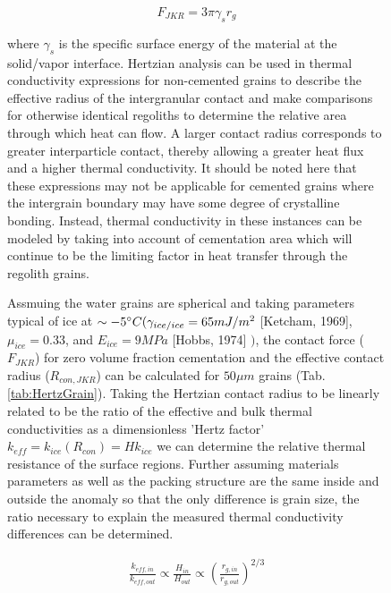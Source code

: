 \documentclass[11pt]{article} %
\begin{document}
\begin{figure}[ht]
	 \begin{equation}
	 F_{JKR} = 3 \pi \gamma_{s} r_{g}
	 \end{equation} 
	 
	 where $\gamma_{s}$ is the specific surface energy of the material at the solid/vapor interface. Hertzian analysis can be used in thermal conductivity expressions for non-cemented grains to describe the effective radius of the intergranular contact and make comparisons for otherwise identical regoliths to determine the relative area through which heat can flow. A larger contact radius corresponds to greater interparticle contact, thereby allowing a greater heat flux and a higher thermal conductivity. It should be noted here that these expressions may not be applicable for cemented grains where the intergrain boundary may have some degree of crystalline bonding. Instead, thermal conductivity in these instances can be modeled by taking into account of cementation area which will continue to be the limiting factor in heat transfer through the regolith grains. 
	 

	Assmuing the water grains are spherical and taking parameters typical of ice at $\sim-5\degree C (\gamma_{ice/ice} = 65 mJ/m^{2}$ [Ketcham, 1969], $\mu_{ice} = 0.33$, and $E_{ice} = 9 MPa$ [Hobbs, 1974] $)$, the contact force ($F_{JKR}$) for zero volume fraction cementation and the effective contact radius ($R_{con,JKR}$) can be calculated for $50 \mu m$ grains (Tab.\ref{tab:HertzGrain}). Taking the Hertzian contact radius to be linearly related to be the ratio of the effective and bulk thermal conductivities as a dimensionless 'Hertz factor' $k_{eff} = k_{ice}(R_{con}) = H k_{ice}$ we can determine the relative thermal resistance of the surface regions. Further assuming materials parameters as well as the packing structure are the same inside and outside the anomaly so that the only difference is grain size, the ratio necessary to explain the measured thermal conductivity differences can be determined. 
	
	\begin{align*}
	\frac{k_{eff,in}}{k_{eff,out}} \varpropto \frac{H_{in}}{H_{out}} \varpropto \left( \frac{r_{g,in}}{r_{g,out}} \right)^{2/3}
	\end{align*}
	

\end{figure}
\end{document}
